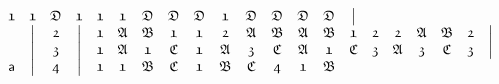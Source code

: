 \documentclass[final,12pt,a4paper,twoside,fleqn]{extbook}
\theoremstyle{definition}
\theoremstyle{remark}
\begin{document}
\begin{equation}
\begin{array}{@{}*{22}c@{}}
      {\mathfrak{1}} &%
      {\mathfrak{1}} &%
      {\mathfrak{D}} &%
      {\mathfrak{1}} &%
      {\mathfrak{1}} &%
      {\mathfrak{1}} &%
      {\mathfrak{D}} &%
      {\mathfrak{D}} &%
      {\mathfrak{D}} &%
      {\mathfrak{1}} &%
      {\mathfrak{D}} &%
      {\mathfrak{D}} &%
      {\mathfrak{D}} &%
      {\mathfrak{D}} &%
      \big\vert         %
      \\ \nonumber
      {}             &%
      \big\vert        &%
      {\mathfrak{2}}       &%
      \big\vert        &%
      {\mathfrak{1}} &%
      {\mathfrak{A}} &%
      {\mathfrak{B}} &%
      {\mathfrak{1}} &%
      {\mathfrak{1}} &%
      {\mathfrak{2}}       &%
      {\mathfrak{A}} &%
      {\mathfrak{B}} &%
      {\mathfrak{A}} &%
      {\mathfrak{B}} &%
      {\mathfrak{1}} &%
      {\mathfrak{2}}       &%
      {\mathfrak{2}}       &%
      {\mathfrak{A}} &%
      {\mathfrak{B}} &%
      {\mathfrak{2}}       &%
      \big\vert         %
      \\ \nonumber
      {}             &%
      \big\vert        &%
      {\mathfrak{3}}        &%
      \big\vert        &%
      {\mathfrak{1}} &%
      {\mathfrak{A}} &%
      {\mathfrak{1}} &%
      {\mathfrak{C}} &%
      {\mathfrak{1}} &%
      {\mathfrak{A}}       &%
      {\mathfrak{3}}        &%
      {\mathfrak{C}}       &%
      {\mathfrak{A}}       &%
      {\mathfrak{1}}     &%
      {\mathfrak{C}}        &%
      {\mathfrak{3}} &%
      {\mathfrak{A}} &%
      {\mathfrak{3}} &%
      {\mathfrak{C}} &%
      {\mathfrak{3}} &%
      \big\vert         %
      \\ \nonumber
      {\textsf{a}}   &%
      \big\vert        &%
      {\mathfrak{4}}       &%
      \big\vert        &%
      {\mathfrak{1}} &%
      {\mathfrak{1}} &%
      {\mathfrak{B}} &%
      {\mathfrak{C}} &%
      {\mathfrak{1}} &%
      {\mathfrak{B}}       &%
      {\mathfrak{C}}        &%
      {\mathfrak{4}} &%
      {\mathfrak{1}}       &%
      {\mathfrak{B}}     &%

\end{array}
\end{equation}
\end{document}
